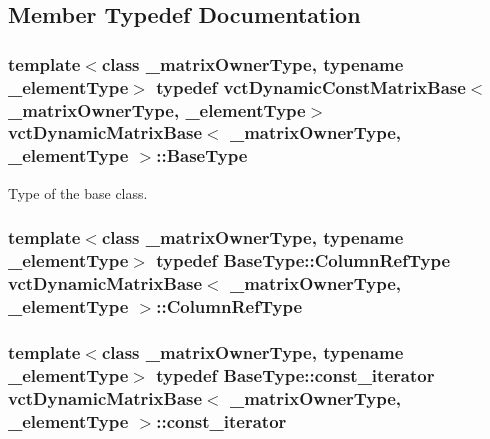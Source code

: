 \subsection{Member Typedef Documentation}
\hypertarget{classvct_dynamic_matrix_base_a6285355f814f82089376c6819d127fd4}{
\subsubsection[{Base\-Type}]{\setlength{\rightskip}{0pt plus 5cm}template$<$class \-\_\-matrix\-Owner\-Type, typename \-\_\-element\-Type$>$ typedef {\bf vct\-Dynamic\-Const\-Matrix\-Base}$<$\-\_\-matrix\-Owner\-Type, \-\_\-element\-Type$>$ {\bf vct\-Dynamic\-Matrix\-Base}$<$ \-\_\-matrix\-Owner\-Type, \-\_\-element\-Type $>$\-::{\bf Base\-Type}}}\label{classvct_dynamic_matrix_base_a6285355f814f82089376c6819d127fd4}
Type of the base class. \hypertarget{classvct_dynamic_matrix_base_a6fabbe3b8fdbfbb4a53f90622a520699}{
\subsubsection[{Column\-Ref\-Type}]{\setlength{\rightskip}{0pt plus 5cm}template$<$class \-\_\-matrix\-Owner\-Type, typename \-\_\-element\-Type$>$ typedef {\bf Base\-Type\-::\-Column\-Ref\-Type} {\bf vct\-Dynamic\-Matrix\-Base}$<$ \-\_\-matrix\-Owner\-Type, \-\_\-element\-Type $>$\-::{\bf Column\-Ref\-Type}}}\label{classvct_dynamic_matrix_base_a6fabbe3b8fdbfbb4a53f90622a520699}
\hypertarget{classvct_dynamic_matrix_base_a63eb2ea8f5972efe2f125a8c22b46670}{
\subsubsection[{const\-\_\-iterator}]{\setlength{\rightskip}{0pt plus 5cm}template$<$class \-\_\-matrix\-Owner\-Type, typename \-\_\-element\-Type$>$ typedef {\bf Base\-Type\-::const\-\_\-iterator} {\bf vct\-Dynamic\-Matrix\-Base}$<$ \-\_\-matrix\-Owner\-Type, \-\_\-element\-Type $>$\-::{\bf const\-\_\-iterator}}}\label{classvct_dynamic_matrix_base_a63eb2ea8f5972efe2f125a8c22b46670}
